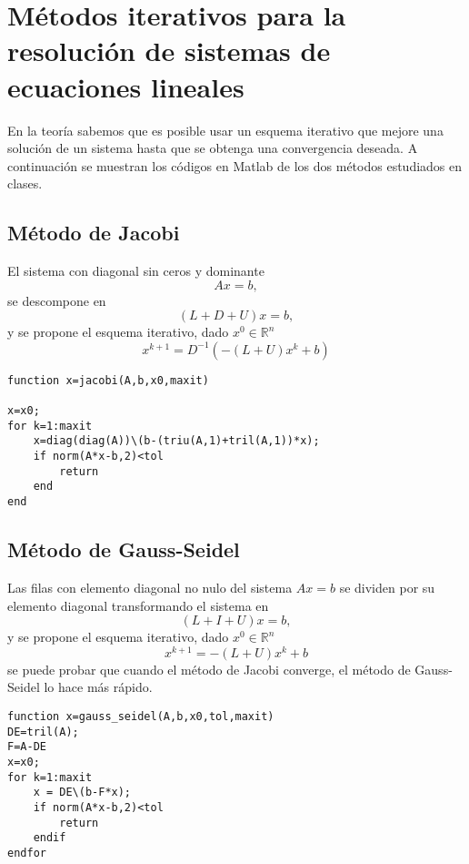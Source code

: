 \documentclass[letter,11pt]{article}
\begin{document}
\section{M\'etodos iterativos para la resoluci\'on de sistemas de ecuaciones lineales}                                                         
En la teor\'ia sabemos que es posible usar un esquema iterativo que mejore una soluci\'on de un sistema hasta que se obtenga una convergencia deseada. A continuaci\'on se muestran los c\'odigos en Matlab de los dos m\'etodos estudiados en clases.
\subsection{M\'etodo de Jacobi}
El sistema con diagonal sin ceros y dominante
$$
Ax=b,
$$
se descompone en 
$$
(L+D+U)x=b,
$$
y se propone el esquema iterativo, dado $x^0\in\mathbb{R}^n$
$$
x^{k+1}=D^{-1}(-(L+U)x^k+b)
$$
\begin{verbatim}
function x=jacobi(A,b,x0,maxit)

x=x0;
for k=1:maxit
    x=diag(diag(A))\(b-(triu(A,1)+tril(A,1))*x);
    if norm(A*x-b,2)<tol
        return
    end
end
\end{verbatim}

\subsection{M\'etodo de Gauss-Seidel}
Las filas con elemento diagonal no nulo del sistema  $Ax=b$ se dividen por su elemento diagonal transformando el sistema en
$$
(L+I+U)x=b,
$$
y se propone el esquema iterativo, dado $x^0\in\mathbb{R}^n$
$$
x^{k+1}=-(L+U)x^k+b
$$
se puede probar que cuando el m\'etodo de Jacobi converge, el m\'etodo de Gauss-Seidel lo hace m\'as r\'apido.
\begin{verbatim}
function x=gauss_seidel(A,b,x0,tol,maxit)
DE=tril(A);
F=A-DE
x=x0;
for k=1:maxit
    x = DE\(b-F*x);
    if norm(A*x-b,2)<tol
        return
    endif
endfor
\end{verbatim}
\end{document}
